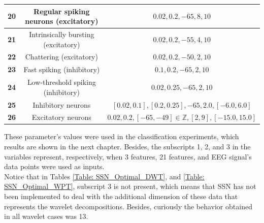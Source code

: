 \begin{table}[h!]
{\begin{tabular}{|*{3}{c|}}
		\textbf{20}    &  Regular spiking neurons (excitatory) & ${0.02, 0.2, -65, 8, 10}$ \\\hline
		\textbf{21}    &  Intrinsically bursting (excitatory) & ${0.02, 0.2, -55, 4, 10}$ \\\hline
		\textbf{22}    &  Chattering (excitatory) & ${0.02, 0.2, -50, 2, 10}$ \\\hline
		\textbf{23}    &  Fast spiking (inhibitory) & ${0.1, 0.2, -65, 2, 10}$ \\\hline
		\textbf{24}    &  Low-threshold spiking (inhibitory) & ${0.02, 0.25, -65, 2, 10}$ \\\hline
		\textbf{25}    &  Inhibitory neurons & ${[0.02, 0.1], [0.2, 0.25], -65, 2.0, [-6.0, 6.0]}$ \\\hline
		\textbf{26}    &  Excitatory neurons & ${0.02, 0.2, [-65, -49]\in \mathbb{Z}, [2, 9], [-15.0, 15.0]}$ \\\hline
	\end{tabular}%
	}
	\label{Table: Izhikevich_behaviors}%
\end{table}%

These parameter's values were used in the classification experiments, which results are shown in the next chapter. Besides, the subscripts 1, 2, and 3 in the variables represent, respectively, when 3 features, 21 features, and EEG signal's data points were used as inputs.\\

Notice that in Tables \ref{Table: SSN_Optimal_DWT}, and \ref{Table: SSN_Optimal_WPT}, subscript 3 is not present, which means that SSN has not been implemented to deal with the additional dimension of these data that represents the wavelet decompositions. Besides, curiously the behavior obtained in all wavelet cases was 13.\\

